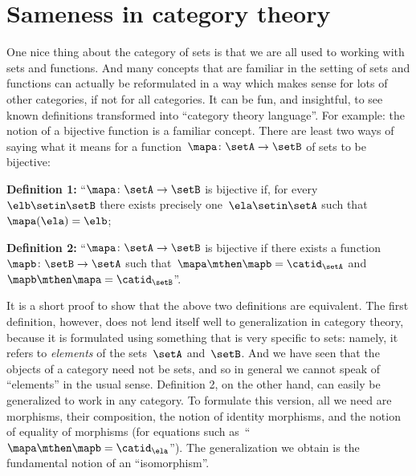 
\section{Sameness in category theory}
\label{sec:attributes_sameness}

One nice thing about the category of sets is that we are all used to working with sets and functions.
And many concepts that are familiar in the setting of sets and functions can actually be reformulated in a way which makes sense for lots of other categories, if not for all categories.
It can be fun, and insightful, to see known definitions transformed into ``category theory language''.
For example: the notion of a bijective function is a familiar concept.
There are least two ways of saying what it means for a function~$\mapa \colon \setA \to \setB$ of sets to be bijective:

\textbf{Definition 1:} ``$\mapa \colon \setA \to \setB$ is bijective if, for every~$\elb \setin \setB$ there exists precisely one~$\ela \setin \setA$ such that~$\mapa(\ela) = \elb$;

\textbf{Definition 2:} ``$\mapa \colon \setA \to \setB$ is bijective if there exists a function~$\mapb\colon \setB \to \setA$ such that~$\mapa \mthen \mapb = \catid_\setA$ and~$\mapb \mthen \mapa = \catid_\setB$''.

It is a short proof to show that the above two definitions are equivalent.
The first definition, however, does not lend itself well to generalization in category theory, because it is formulated using something that is very specific to sets: namely, it refers to \emph{elements} of the sets~$\setA$ and~$\setB$.
And we have seen that the objects of a category need not be sets, and so in general we cannot speak of ``elements'' in the usual sense.
Definition 2, on the other hand, can easily be generalized to work in any category.
To formulate this version, all we need are morphisms, their composition, the notion of identity morphisms, and the notion of equality of morphisms (for equations such as~``$\mapa \mthen \mapb= \catid_\ela$'').
The generalization we obtain is the fundamental notion of an ``isomorphism''.



